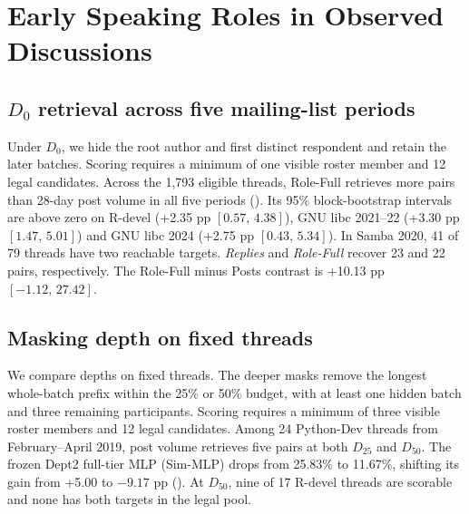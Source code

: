 \section{Early Speaking Roles in Observed Discussions}
\subsection{\texorpdfstring{$D_0$}{D0} retrieval across five mailing-list periods}
Under $D_0$, we hide the root author and first distinct respondent and retain the later batches. Scoring requires a minimum of one visible roster member and 12 legal candidates. Across the 1,793 eligible threads, Role-Full retrieves more pairs than 28-day post volume in all five periods (). Its 95\% block-bootstrap intervals are above zero on R-devel (+2.35 pp $[0.57,\,4.38]$), GNU libc 2021--22 (+3.30 pp $[1.47,\,5.01]$) and GNU libc 2024 (+2.75 pp $[0.43,\,5.34]$). In Samba 2020, 41 of 79 threads have two reachable targets. \emph{Replies} and \emph{Role-Full} recover 23 and 22 pairs, respectively. The Role-Full minus Posts contrast is +10.13 pp $[-1.12,\,27.42]$.

\FloatBarrier

\subsection{Masking depth on fixed threads}
We compare depths on fixed threads. The deeper masks remove the longest whole-batch prefix within the 25\% or 50\% budget, with at least one hidden batch and three remaining participants. Scoring requires a minimum of three visible roster members and 12 legal candidates. Among 24 Python-Dev threads from February--April 2019, post volume retrieves five pairs at both $D_{25}$ and $D_{50}$. The frozen Dept2 full-tier MLP (Sim-MLP) drops from 25.83\% to 11.67\%, shifting its gain from +5.00 to $-9.17$ pp (). At $D_{50}$, nine of 17 R-devel threads are scorable and none has both targets in the legal pool.

